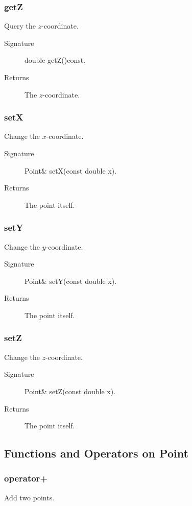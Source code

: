 \subsubsection{getZ}
Query the $z$-coordinate.
\begin{description}
  \item[Signature] double getZ()const.
  \item[Returns] The $z$-coordinate.
\end{description}

\subsubsection{setX}
Change the $x$-coordinate. 
\begin{description}
  \item[Signature] Point\& setX(const double x).
  \item[Returns] The point itself.
\end{description}

\subsubsection{setY}
Change the $y$-coordinate.
\begin{description}
   \item[Signature] Point\& setY(const double x).
  \item[Returns] The point itself.
\end{description}

\subsubsection{setZ}
Change the $z$-coordinate.
\begin{description}
  \item[Signature] Point\& setZ(const double x).
  \item[Returns] The point itself.
\end{description}

\subsection{Functions and Operators on Point}

\subsubsection{operator+}
Add two points.
 
